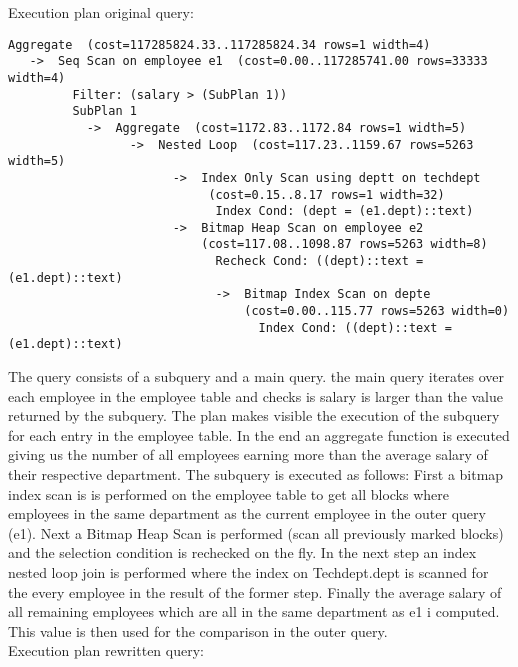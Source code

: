 \documentclass[11pt]{scrartcl}
\begin{document}
Execution plan original query:
\begin{noindent}
\begin{verbatim}
Aggregate  (cost=117285824.33..117285824.34 rows=1 width=4)
   ->  Seq Scan on employee e1  (cost=0.00..117285741.00 rows=33333 width=4)
         Filter: (salary > (SubPlan 1))
         SubPlan 1
           ->  Aggregate  (cost=1172.83..1172.84 rows=1 width=5)
                 ->  Nested Loop  (cost=117.23..1159.67 rows=5263 width=5)
                       ->  Index Only Scan using deptt on techdept 
	                        (cost=0.15..8.17 rows=1 width=32)
                             Index Cond: (dept = (e1.dept)::text)
                       ->  Bitmap Heap Scan on employee e2  
	                       (cost=117.08..1098.87 rows=5263 width=8)
                             Recheck Cond: ((dept)::text = (e1.dept)::text)
                             ->  Bitmap Index Scan on depte  
	                             (cost=0.00..115.77 rows=5263 width=0)
                                   Index Cond: ((dept)::text = (e1.dept)::text)
\end{verbatim}
\end{noindent}
The query consists of a subquery and a main query. the main query iterates over each employee in the employee table and checks is salary is larger than the value returned by the subquery. The plan makes visible the execution of the subquery for each entry in the employee table. In the end an aggregate function is executed giving us the number of all employees earning more than the average salary of their respective department.
The subquery is executed as follows:
First a bitmap index scan is is performed on the employee table to get all blocks where employees in the same department as the current employee in the outer query (e1). Next a Bitmap Heap Scan is performed (scan all previously marked blocks) and the selection condition is rechecked on the fly. In the next step an index nested loop join is performed where the index on Techdept.dept is scanned for the every employee in the result of the former step. Finally the average salary of all remaining employees which are all in the same department as e1 i computed. This value is then used for the comparison in the outer query.
\newpage
\ \\
Execution plan rewritten query:
\end{document}

